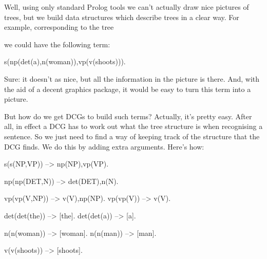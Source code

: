 Well, using only standard Prolog tools we can't actually draw nice
pictures of trees, but we  build data structures which
describe trees in a clear way.  For example, corresponding to the tree

\begin{quote}
    { 
             {
                     {}
                     {}}
             {
                     {}
             }}
\end{quote}
we could have the following term:
\begin{LPNcodedisplay}
s(np(det(a),n(woman)),vp(v(shoots))).
\end{LPNcodedisplay}
Sure: it doesn't  as nice, but all the information in
the picture is there.  And, with the aid of a decent graphics package,
it would be easy to turn this term into a picture.

But how do we get DCGs to build such terms?  Actually, it's pretty
easy.  After all, in effect a DCG has to work out what the tree
structure is when recognising a sentence.  So we just need to find a
way of keeping track of the structure that the DCG finds.  We do this
by adding extra arguments.  Here's how:
\begin{LPNcodedisplay}
s(s(NP,VP)) --> np(NP),vp(VP).

np(np(DET,N)) --> det(DET),n(N).

vp(vp(V,NP)) --> v(V),np(NP).
vp(vp(V))    --> v(V).

det(det(the)) --> [the].
det(det(a))   --> [a].

n(n(woman)) --> [woman].
n(n(man))   --> [man].

v(v(shoots)) --> [shoots].
\end{LPNcodedisplay}


